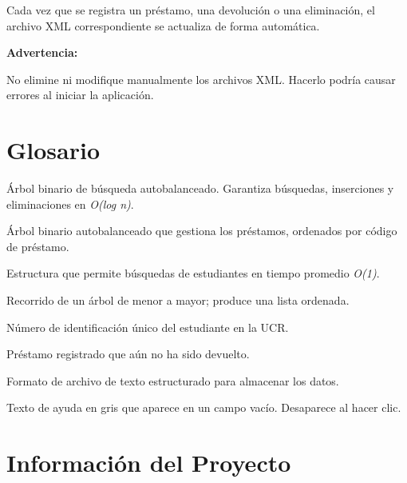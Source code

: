 \documentclass[12pt, a4paper]{article}
\newenvironment{warnbox}{%
  \vspace{6pt}\par\noindent
  \begin{lrbox}{\mybox}%
    \begin{minipage}{\dimexpr\linewidth-16pt\relax}%
      \noindent\textcolor{UCRRed}{\textbf{Advertencia:}}\ %
}{%
    \end{minipage}%
  \end{lrbox}%
  \setlength{\fboxsep}{8pt}%
  \colorbox{WarnYell}{\usebox{\mybox}}%
  \vspace{6pt}\par%
}
\begin{document}
Cada vez que se registra un préstamo, una devolución o una eliminación,
el archivo XML correspondiente se actualiza de forma automática.

\begin{warnbox}
No elimine ni modifique manualmente los archivos XML.
Hacerlo podría causar errores al iniciar la aplicación.
\end{warnbox}

\section{Glosario}

\begin{description}[leftmargin=3.2cm, labelwidth=3cm, style=nextline]
  \item[AVL]
    Árbol binario de búsqueda autobalanceado.
    Garantiza búsquedas, inserciones y eliminaciones en \textit{O(log n)}.
  \item[Árbol Rojo-Negro]
    Árbol binario autobalanceado que gestiona los préstamos,
    ordenados por código de préstamo.
  \item[Tabla Hash]
    Estructura que permite búsquedas de estudiantes en tiempo promedio \textit{O(1)}.
  \item[In-orden]
    Recorrido de un árbol de menor a mayor; produce una lista ordenada.
  \item[Carnet]
    Número de identificación único del estudiante en la UCR.
  \item[Préstamo activo]
    Préstamo registrado que aún no ha sido devuelto.
  \item[XML]
    Formato de archivo de texto estructurado para almacenar los datos.
  \item[Placeholder]
    Texto de ayuda en gris que aparece en un campo vacío.
    Desaparece al hacer clic.
\end{description}

\section{Información del Proyecto}
\end{document}
